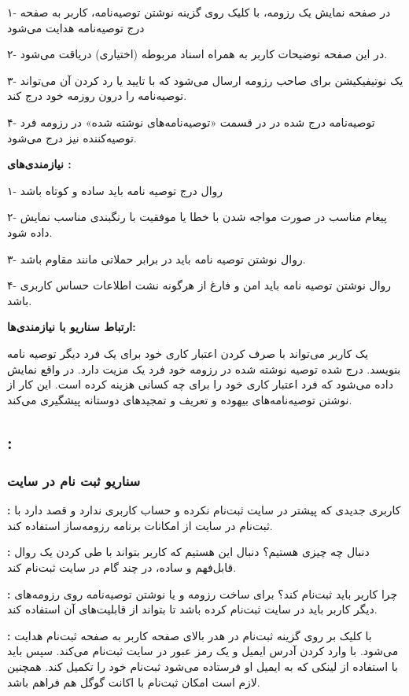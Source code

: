 \documentclass[]{article}
\begin{document}
	۱- در صفحه نمایش یک رزومه، با کلیک روی گزینه نوشتن توصیه‌نامه، کاربر به صفحه درج توصیه‌نامه هدایت می‌شود
	
	۲- در این صفحه توضیحات کاربر به همراه اسناد مربوطه (اختیاری) دریاقت می‌شود.
	
	۳- یک نوتیفیکیشن برای صاحب رزومه ارسال می‌شود که با تایید یا رد کردن آن می‌تواند توصیه‌نامه را درون روزمه خود درج کند.
	
	۴- توصیه‌نامه درج شده در در قسمت «توصیه‌‌نامه‌های نوشته شده» در رزومه فرد توصیه‌کننده نیز درج می‌شود. 
	
	
	\textbf{نیازمندی‌های :}
	
	۱- روال درج توصیه نامه باید ساده و کوتاه باشد
	
	۲- پیغام مناسب در صورت مواجه شدن با خطا یا موفقیت با رنگبندی مناسب نمایش داده شود.
	
	۳- روال نوشتن توصیه نامه باید در برابر حملاتی مانند  مقاوم باشد.
	
	۴- روال نوشتن توصیه نامه باید امن و فارغ از هرگونه نشت اطلاعات حساس کاربری باشد.
	
	\textbf{
		ارتباط سناریو با نیازمندی‌ها:}
	
	یک کاربر می‌تواند با صرف کردن اعتبار کاری خود برای یک فرد دیگر توصیه نامه بنویسد. درج شده توصیه نوشته شده در رزومه خود فرد یک مزیت دارد. در واقع نمایش داده می‌شود که فرد اعتبار کاری خود را برای چه کسانی هزینه کرده است. این کار از نوشتن توصیه‌نامه‌های بیهوده و تعریف و تمجید‌های دوستانه پیشگیری می‌کند.
	
	
	\subsection{\LARGE{\textbf{}:}}
	\subsubsection{\Large{سناریو ثبت نام در سایت}}
	\textbf{:} کاربری جدیدی که پیشتر در سایت ثبت‌نام نکرده و حساب کاربری ندارد و قصد دارد با ثبت‌نام در سایت از امکانات برنامه رزومه‌ساز استفاده کند.
	
	\textbf{:} دنبال چه چیزی هستیم؟ دنبال این هستیم که کاربر بتواند با طی کردن یک روال قابل‌فهم و ساده، در چند گام در سایت ثبت‌نام کند.
	
	\textbf{:} چرا کاربر باید ثبت‌نام کند؟ برای ساخت رزومه و یا نوشتن توصیه‌نامه روی رزومه‌های دیگر کاربر باید در سایت ثبت‌نام کرده باشد تا بتواند از قابلیت‌های آن استفاده کند.
	
	\textbf{:} با کلیک بر روی گزینه ثبت‌نام در هدر بالای صفحه کاربر به صفحه ثبت‌نام هدایت می‌شود. با وارد کردن آدرس ایمیل و یک رمز عبور در سایت ثبت‌نام می‌کند. سپس باید با استفاده از لینکی که به ایمیل او فرستاده می‌شود ثبت‌نام خود را تکمیل کند. همچنین لازم است امکان ثبت‌نام با اکانت گوگل هم فراهم باشد.
	
\end{document}
